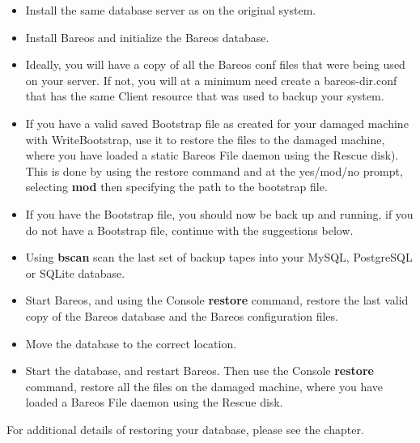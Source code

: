 \begin{itemize}
\item Install the same database server as on the original system.
\item Install Bareos and initialize the Bareos database.
\item Ideally, you will have a copy of all the Bareos conf files that
   were being used on your server. If not, you will at a minimum need
   create a bareos-dir.conf that has the same Client resource that
   was used to backup your system.
\item If you have a valid saved Bootstrap file as created for your damaged
   machine with WriteBootstrap, use it to restore the files to the damaged
   machine, where you have loaded a static Bareos File daemon using the
   Rescue disk).  This is done by using the restore command and at
   the yes/mod/no prompt, selecting {\bf mod} then specifying the path to
   the bootstrap file.
\item If you have the Bootstrap file, you should now be back up and  running,
   if you do not have a Bootstrap file, continue with the  suggestions below.
\item Using {\bf bscan} scan the last set of backup tapes into your  MySQL,
   PostgreSQL or SQLite database.
\item Start Bareos, and using the Console {\bf restore} command,  restore the
   last valid copy of the Bareos database and the Bareos configuration
   files.
\item Move the database to the correct location.
\item Start the database, and restart Bareos. Then use the Console {\bf
   restore} command, restore all the files  on the damaged machine, where you
   have loaded a Bareos File  daemon using the Rescue disk.
\end{itemize}

For additional details of restoring your database, please see the
 chapter.



